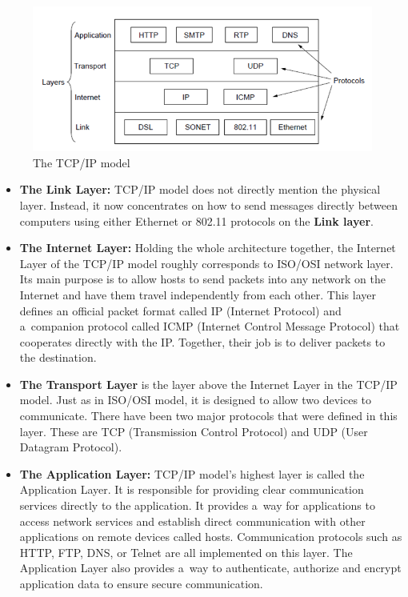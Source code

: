 \documentclass[
  printed,     %
  color,       %
  oneside,     %
  nosansbold,  %
  nocolorbold, %
  nolof,         %
  nolot,         %
]{fithesis4}
\begin{document}
\begin{figure}[h]
  \begin{center}
    \includegraphics[width=1\textwidth]{images/tcpip_new.png}
  \end{center}
  \caption{The TCP/IP model~\cite{10.5555/2584507}}
  \label{fig:tcpipmodel}
\end{figure}

\newpage

\begin{itemize}
    \item \textbf{The Link Layer:} TCP/IP model does not directly mention the physical layer. Instead, it now concentrates on how to send messages directly between computers using either Ethernet or 802.11 protocols on the \textbf{Link layer}.

    \item \textbf{The Internet Layer:} Holding the whole architecture together, the Internet Layer of the TCP/IP model roughly corresponds to ISO/OSI network layer. Its main purpose is to allow hosts to send packets into any network on the Internet and have them travel independently from each other. This layer defines an official packet format called IP (Internet Protocol) and a~companion protocol called ICMP (Internet Control Message Protocol) that cooperates directly with the IP. Together, their job is to deliver packets to the destination.

    \item \textbf{The Transport Layer} is the layer above the Internet Layer in the TCP/IP model. Just as in ISO/OSI model, it is designed to allow two devices to communicate. There have been two major protocols that were defined in this layer. These are TCP (Transmission Control Protocol) and UDP (User Datagram Protocol).

    \item \textbf{The Application Layer:} TCP/IP model's highest layer is called the Application Layer. It is responsible for providing clear communication services directly to the application. It provides a~way for applications to access network services and establish direct communication with other applications on remote devices called hosts. Communication protocols such as HTTP, FTP, DNS, or Telnet are all implemented on this layer. The Application Layer also provides a~way to authenticate, authorize and encrypt application data to ensure secure communication.
\end{itemize}
\end{document}
